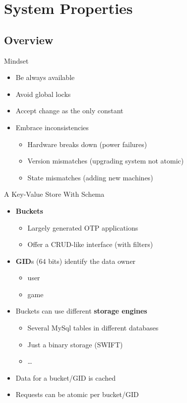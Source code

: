 \documentclass[aspectratio=43]{beamer}
\begin{document}
\section{System Properties}

\subsection{Overview}

\begin{frame}{Mindset}
    \begin{itemize}
        \item Be always available
        \item Avoid global locks
        \item Accept change as the only constant
        \item Embrace inconsistencies
            \begin{itemize}
                \item Hardware breaks down (power failures)
                \item Version mismatches (upgrading system not atomic)
                \item State mismatches (adding new machines)
            \end{itemize}
    \end{itemize}
\end{frame}

\begin{frame}{A Key-Value Store With Schema}
    \begin{itemize}
        \item \textbf{Buckets}
            \begin{itemize}
                \item Largely generated OTP applications
                \item Offer a CRUD-like interface (with filters)
            \end{itemize}
        \item \textbf{GID}s (64 bits) identify the data owner
            \begin{itemize}
                \item user
                \item game
            \end{itemize}
        \item Buckets can use different \textbf{storage engines}
            \begin{itemize}
                \item Several MySql tables in different databases
                \item Just a binary storage (SWIFT)
                \item \dots
            \end{itemize}
        \item Data for a bucket/GID is cached
        \item Requests can be atomic per bucket/GID
    \end{itemize}
\end{frame}
\end{document}
